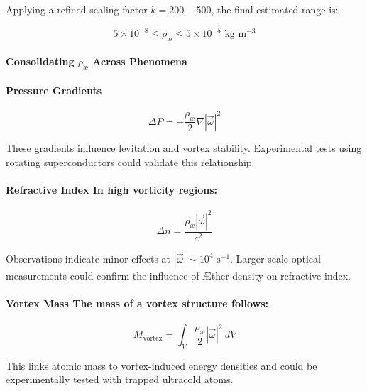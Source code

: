 Applying a refined scaling factor $k = 200 - 500$, the final estimated range is:

\begin{equation*}
5 \times 10^{-8} \leq \rho_\text{\ae} \leq 5 \times 10^{-5} \text{ kg} \text{ m}^{-3}
\end{equation*}

\paragraph{Consolidating $\rho_\text{\ae}$ Across Phenomena}

\paragraph{Pressure Gradients}

\begin{equation*}
\Delta P = -\frac{\rho_\text{\ae}}{2} \nabla |\vec{\omega}|^2
\end{equation*}

These gradients influence levitation and vortex stability. Experimental tests using rotating superconductors could validate this relationship.

\paragraph{Refractive Index In high vorticity regions:}

\begin{equation*}
\Delta n = \frac{\rho_\text{\ae} |\vec{\omega}|^2}{c^2}
\end{equation*}

Observations indicate minor effects at $|\vec{\omega}| \sim 10^4 \text{ s}^{-1}$. Larger-scale optical measurements could confirm the influence of Æther density on refractive index.

\paragraph{Vortex Mass The mass of a vortex structure follows:}

\begin{equation*}
M_{\text{vortex}} = \int_V \frac{\rho_\text{\ae}}{2} | \vec{\omega}|^2 \ dV
\end{equation*}

This links atomic mass to vortex-induced energy densities and could be experimentally tested with trapped ultracold atoms.


